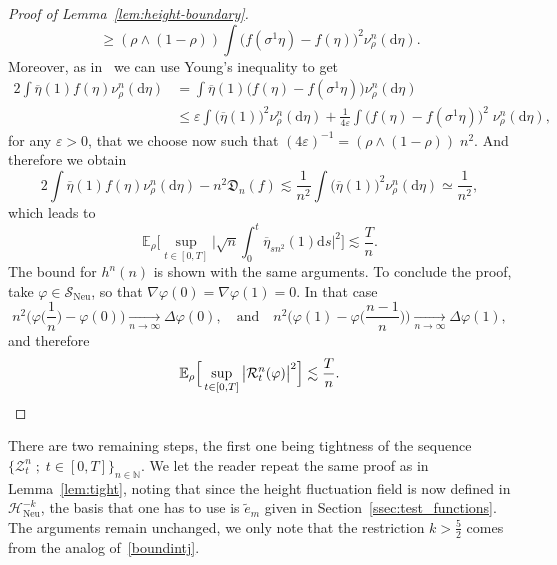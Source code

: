 \documentclass[10pt]{amsart}
\theoremstyle{definition}\newtheorem{defi}[theo]{Definition}\newtheorem{rema}[theo]{Remark}\newtheorem{exam}[theo]{Example}\newtheorem{exem}[theo]{Example}\newtheorem{nota}[theo]{Notation}
\DeclareMathOperator{\Neu}{Neu}
\newcommand{\bb}[1]{{\mathbb #1}}
\newcommand{\mc}[1]{{\mathcal #1}}
\renewcommand{\mc}[1]{{\mathcal #1}}
\newcommand{\SN}{\ensuremath{\mc S_{\Neu}}}
\renewcommand{\bar}{\overline}
\renewcommand{\leq}{\leqslant}
\renewcommand{\ge}{\geqslant}
\renewcommand{\tilde}{\widetilde}
\newcommand*{\dd}{\mathrm{d}}
\newcommand*{\ds}{\dd s}
\renewcommand{\tfrac}{\frac}
\begin{document}
\begin{proof}[Proof of Lemma~\ref{lem:height-boundary}]
\[\ge (\rho \wedge (1-\rho)) \int \big(f (\sigma^1 \eta) - f (\eta)\big)^2 \nu^n_\rho(\dd\eta).
\]
Moreover, as in~\cite[Lemma~3]{Franco2016} we can use Young's inequality to get
\begin{align*}
2\int \bar\eta (1) f(\eta) \nu^n_\rho(\dd\eta) & = \int \bar\eta (1) \big(f (\eta) - f (\sigma^1 \eta)\big) \nu^n_\rho(\dd\eta) \\ & \leq \varepsilon \int \big(\bar\eta(1)\big)^2 \nu^n_\rho(\dd\eta) + \frac{1}{4\varepsilon}\int \big(f (\eta) - f (\sigma^1 \eta)\big)^2 \; \nu^n_\rho(\dd\eta),
\end{align*}
for any $\varepsilon >0$, that we choose now such that $(4\varepsilon)^{-1} = {(\rho \wedge (1-\rho))\; n^2}$. And therefore we obtain
\[
2
\int \bar\eta (1) f(\eta) \nu^n_\rho(\dd\eta) - n^2\mathfrak{D}_n(f)
\lesssim \frac{1}{n^2} \int \big(\bar\eta(1)\big)^2 \nu^n_\rho(\dd\eta) \simeq \frac{1}{n^2},
\]
which leads to
\[
\mathbb{E}_{\rho} \Bigg[\sup_{t \in [0,T]} \bigg|\sqrt n \int_0^t
\bar\eta_{sn^2} (1) \ds \bigg|^2 \Bigg] \lesssim
\frac{T}{n}.
\]
The bound for $h^n (n)$ is shown with the same arguments. To conclude the proof, take $\varphi \in \SN$, so that $\nabla \varphi(0)=\nabla\varphi(1)=0$. In that case
\[
n^2\Big(\varphi\Big(\tfrac1n\Big)-\varphi(0)\Big) \xrightarrow[n\to\infty]{}\Delta\varphi(0), \quad \text{and}\quad n^2\Big(\varphi(1)-\varphi\Big(\tfrac{n-1}{n}\Big)\Big) \xrightarrow[n\to\infty]{}\Delta\varphi(1),
\]
and therefore
\[
\bb E_\rho\Big[\sup_{t\in[0,T]} \big|\mc R_t^n(\varphi)\big|^2\Big] \lesssim \frac{T}{n}.\qedhere
\]
\end{proof}

There are two remaining steps, the first one being tightness of the sequence $\{\mc Z_t^n \; ; \; t \in [0,T]\}_{n\in\bb N}$. We let the reader repeat the same proof as in Lemma~\ref{lem:tight}, noting that since the height fluctuation field is now defined in $\mc H_{\Neu}^{-k}$, the basis that one has to use is $\tilde e_m$ given in Section~\ref{ssec:test_functions}. The arguments remain unchanged, we only note that the restriction $k>\frac52$ comes from the analog of~\eqref{boundintj}.
\end{document}
